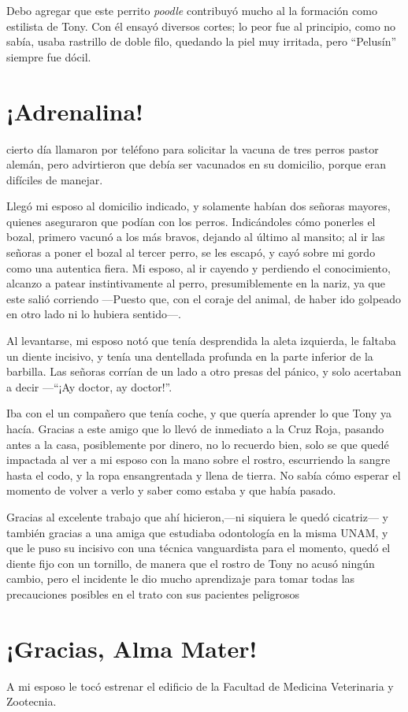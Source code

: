 \documentclass[letterpaper, 12pt]{book}
\begin{document}
Debo agregar que este perrito {\it poodle} contribuyó mucho  al la formación como estilista de Tony. Con él ensayó diversos cortes; lo peor fue al principio, como no sabía, usaba rastrillo de doble filo, quedando la piel muy irritada, pero ``Pelusín'' siempre fue dócil.
\chapter{¡Adrenalina!}
cierto día llamaron por teléfono para solicitar la vacuna de tres perros pastor alemán, pero advirtieron que debía ser vacunados en su domicilio, porque eran difíciles de manejar.

Llegó mi esposo al domicilio indicado, y solamente habían dos señoras mayores, quienes aseguraron que podían con los perros. Indicándoles cómo ponerles el bozal, primero vacunó a los más bravos, dejando al último al mansito; al ir las señoras a poner el bozal al tercer perro, se les escapó, y cayó sobre mi gordo como una autentica fiera. Mi esposo, al ir cayendo y perdiendo el conocimiento, alcanzo a patear instintivamente al perro, presumiblemente en la nariz, ya que este salió corriendo ---Puesto que, con el coraje del animal, de haber ido golpeado en otro lado ni lo hubiera sentido---. 

 Al levantarse, mi esposo notó que tenía desprendida la aleta izquierda, le faltaba un diente incisivo, y tenía una dentellada profunda en la parte inferior de la barbilla. Las señoras corrían de un lado a otro presas del pánico, y solo acertaban a decir ---``¡Ay doctor, ay doctor!''.

Iba con el un compañero que tenía coche, y que quería aprender lo que Tony ya hacía. Gracias a este amigo que lo llevó de inmediato a la Cruz Roja, pasando antes a la casa, posiblemente por dinero, no lo recuerdo bien, solo se que quedé impactada al ver a mi esposo con la mano sobre el rostro, escurriendo la sangre hasta el codo, y la ropa ensangrentada y llena de tierra.
No sabía cómo esperar el momento de volver a verlo y saber como estaba y que había pasado.

Gracias al excelente trabajo que ahí hicieron,---ni siquiera le quedó cicatriz--- y también gracias a una amiga que estudiaba odontología en la misma UNAM, y que le puso su incisivo con una técnica vanguardista para el momento, quedó el diente fijo con un tornillo, de manera que el rostro de Tony no acusó ningún  cambio, pero el incidente le dio mucho aprendizaje para tomar todas las precauciones posibles en el trato con sus pacientes peligrosos
\chapter{¡Gracias, Alma Mater!}
A mi esposo le tocó estrenar el edificio de la Facultad de Medicina Veterinaria y Zootecnia. 
\end{document}
